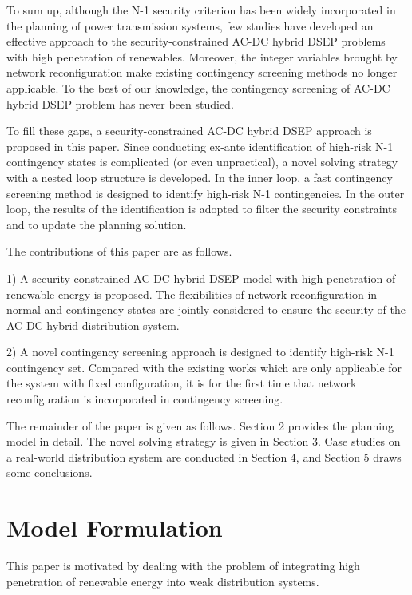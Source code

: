 \documentclass[a4paper,fleqn]{cas-dc}
\begin{document}
To sum up, although the N-1 security criterion has been widely incorporated 
in the planning of power transmission systems, few studies have developed
an effective approach to the security-constrained AC-DC hybrid DSEP problems
with high penetration of renewables. Moreover, the integer variables 
brought by network reconfiguration make existing contingency screening 
methods no longer applicable. 
{\color{blue}
To the best of our knowledge, the
contingency screening of AC-DC hybrid DSEP problem has 
never been studied.
}

To fill these gaps, a security-constrained AC-DC hybrid DSEP approach is 
proposed in this paper. Since conducting ex-ante identification of high-risk 
N-1 contingency states is complicated (or even unpractical), a novel solving 
strategy with a nested loop structure is developed. In the inner loop, a 
fast contingency screening method is designed to identify high-risk N-1
contingencies. In the outer loop, the results of the identification is
adopted to filter the security constraints and to update the planning 
solution.

The contributions of this paper are as follows.

1) A security-constrained AC-DC hybrid DSEP model with high penetration
of renewable energy is proposed. The {\color{blue} flexibilities} of network 
reconfiguration {\color{blue}in} normal and contingency states are jointly 
considered to ensure the security of the AC-DC hybrid distribution system.

2) A novel contingency screening approach is designed to identify high-risk N-1 
contingency set. Compared with the existing works which are only applicable for 
the system with fixed configuration, it is for the first time that network 
reconfiguration is incorporated in contingency screening. 

The remainder of the paper is given as follows. Section 2 provides 
{\color{blue}
the planning model in detail. The 
novel solving strategy is given in Section 3. Case studies on a real-world 
distribution system are conducted in Section 4, and Section 5 draws some 
conclusions.
}

\section{Model Formulation}\label{}

This paper is motivated by dealing with the problem of integrating high 
penetration of renewable energy into weak distribution systems.
\end{document}
